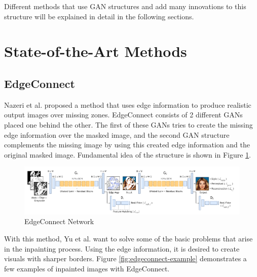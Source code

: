 Different methods that use GAN structures and add many innovations to this structure will be explained in detail in the following sections.

\newpage
\section{State-of-the-Art Methods}

\subsection{EdgeConnect}

Nazeri et al. proposed a method \cite{edgeconnect} that uses edge information to produce realistic output images over missing zones.  EdgeConnect consists of 2 different GANs placed one behind the other. The first of these GANs tries to create the missing edge information over the masked image, and the second GAN structure complements the missing image by using this created edge information and the original masked image. Fundamental idea of the structure is shown in Figure \ref{fig:edgeconnect-network}.

\begin{figure}[h!]
    \centering
    \includegraphics[scale=0.6]{figures/chapter4/EdgeConnect.PNG}
    \vspace*{5mm}
    \caption{EdgeConnect Network \cite{edgeconnect}}
    \label{fig:edgeconnect-network}
\end{figure}

With this method, Yu et al. want to solve some of the basic problems that arise in the inpainting process. Using the edge information, it is desired to create visuals with sharper borders. Figure \ref{fig:edgeconnect-example} demonstrates a few examples of inpainted images with EdgeConnect.

